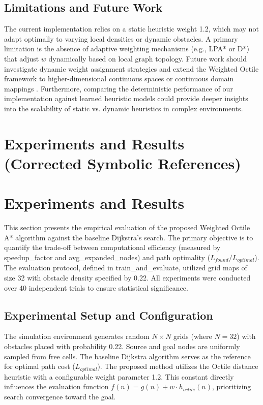 \documentclass[conference]{IEEEtran}
\renewcommand{\texttt}[1]{{\normalfont\ttfamily #1}}
\begin{document}
\subsection{Limitations and Future Work}
The current implementation relies on a static heuristic weight 1.2, which may not adapt optimally to varying local densities or dynamic obstacles. A primary limitation is the absence of adaptive weighting mechanisms (e.g., LPA* or D*) that adjust \(w\) dynamically based on local graph topology. Future work should investigate dynamic weight assignment strategies and extend the Weighted Octile framework to higher-dimensional continuous spaces or continuous domain mappings \cite{zhang2025hardware}. Furthermore, comparing the deterministic performance of our implementation against learned heuristic models \cite{agostinelli2024learned} could provide deeper insights into the scalability of static vs. dynamic heuristics in complex environments.

\section{Experiments and Results (Corrected Symbolic References)}
\section{Experiments and Results}\label{sec:experiments}

This section presents the empirical evaluation of the proposed Weighted Octile A* algorithm against the baseline Dijkstra's search. The primary objective is to quantify the trade-off between computational efficiency (measured by \texttt{speedup\_factor} and \texttt{avg\_expanded\_nodes}) and path optimality ($L_{found}/L_{optimal}$). The evaluation protocol, defined in train\_and\_evaluate, utilized grid maps of size 32 with obstacle density specified by 0.22. All experiments were conducted over 40 independent trials to ensure statistical significance.

\subsection{Experimental Setup and Configuration}
The simulation environment generates random $N \times N$ grids (where $N = \text{32}$) with obstacles placed with probability 0.22. Source and goal nodes are uniformly sampled from free cells. The baseline Dijkstra algorithm serves as the reference for optimal path cost ($L_{optimal}$). The proposed method utilizes the Octile distance heuristic with a configurable weight parameter 1.2. This constant directly influences the evaluation function $f(n) = g(n) + w \cdot h_{octile}(n)$, prioritizing search convergence toward the goal.
\end{document}
